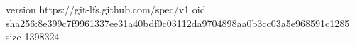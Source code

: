 version https://git-lfs.github.com/spec/v1
oid sha256:8e399c7f9961337ee31a40bdf0c03112da9704898aa0b3cc03a5e968591c1285
size 1398324
